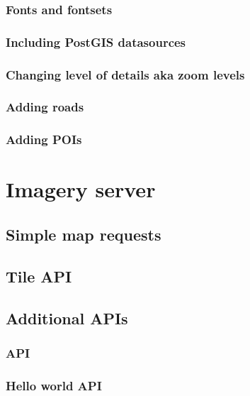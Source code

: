 \documentclass{beamer}
\begin{document}
\begin{frame}
  \frametitle{Fonts and fontsets}

\end{frame}

\begin{frame}
  \frametitle{Including PostGIS datasources}

\end{frame}

\begin{frame}
  \frametitle{Changing level of details aka zoom levels}

\end{frame}

\begin{frame}
  \frametitle{Adding roads}

\end{frame}


\begin{frame}
  \frametitle{Adding POIs}

\end{frame}


\section{Imagery server}

\subsection{Simple map requests}



\subsection{Tile API}

\subsection{Additional APIs}



\begin{frame}
  \frametitle{API}

\end{frame}

\begin{frame}[fragile]
  \frametitle{Hello world API}
\end{frame}
\end{document}
